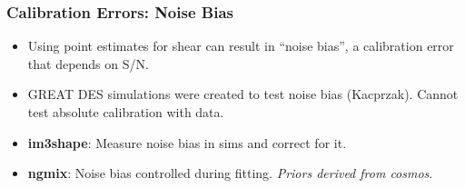\documentclass{beamer}
\newcommand{\ngmix}{{\bf ngmix}}
\newcommand{\imshape}{{\bf im3shape}}
\begin{document}
\frame
{
    \frametitle{Calibration Errors: Noise Bias}

    \fontsize{9}{0.8\baselineskip}
    \begin{itemize}

            \item Using point estimates for shear can result in ``noise bias'', a
                calibration error that depends on S/N.

            \item GREAT DES simulations were created to test noise bias (Kacprzak).
                Cannot test absolute calibration with data.

            \item \imshape:  Measure noise bias in sims and correct for it.

            \item \ngmix: Noise bias controlled during fitting.  {\em Priors derived from cosmos}.
    \end{itemize}

}
\end{document}
